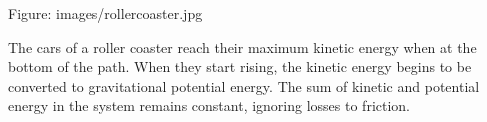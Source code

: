 \documentclass{book}
\begin{document}
	Figure: images/rollercoaster.jpg
	
	The cars of a roller coaster reach their maximum kinetic energy when at the bottom of the path. When they start rising, the kinetic energy begins to be converted to gravitational potential energy. The sum of kinetic and potential energy in the system remains constant, ignoring losses to friction.
	
\end{document}

